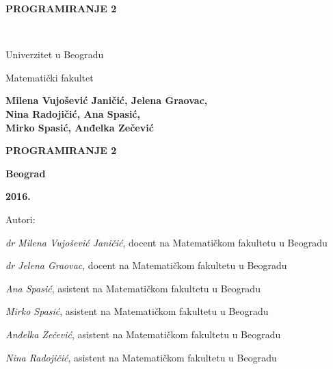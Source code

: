 \pagestyle{empty}

\vspace*{20pt}
\centerline{{\large\bfseries PROGRAMIRANJE 2} \vspace*{2mm}}
\newpage
\verb" "
\newpage
\begin{center}
{\sffamily

{\fontsize{16pt}{19pt}\selectfont Univerzitet u Beogradu}

{\fontsize{16pt}{19pt}\selectfont Matematički fakultet}
\vspace{70pt}

{\fontsize{16pt}{19pt}\selectfont \bfseries  Milena Vujošević Janičić, Jelena Graovac,\\ Nina Radojičić, Ana Spasić,\\ \vspace*{1.5mm} Mirko Spasić, Anđelka Zečević}

\vspace{50pt}
\centerline{{\huge\bfseries PROGRAMIRANJE 2} \vspace*{2mm}}
\centerline{{\huge\bfseries {\fontsize{22pt}{26pt}\selectfont {Zbirka zadataka sa rešenjima}}}}


\vspace{120pt}

\centerline{{\Large \bfseries Beograd}}
\centerline{{\Large \bfseries 2016.}}

}
\end{center}



\newpage
\normalsize

\noindent
Autori: 

\noindent
{\slshape dr Milena Vujošević Janičić}, docent na Matematičkom fakultetu u Beogradu

\noindent
{\slshape dr Jelena Graovac}, docent na Matematičkom fakultetu u Beogradu

\noindent
{\slshape Ana Spasić}, asistent na Matematičkom fakultetu u Beogradu

\noindent
{\slshape Mirko Spasić}, asistent na Matematičkom fakultetu u Beogradu

\noindent
{\slshape Anđelka Zečević}, asistent na Matematičkom fakultetu u Beogradu

\noindent
{\slshape Nina Radojičić}, asistent na Matematičkom fakultetu u Beogradu
\vspace*{2mm}

